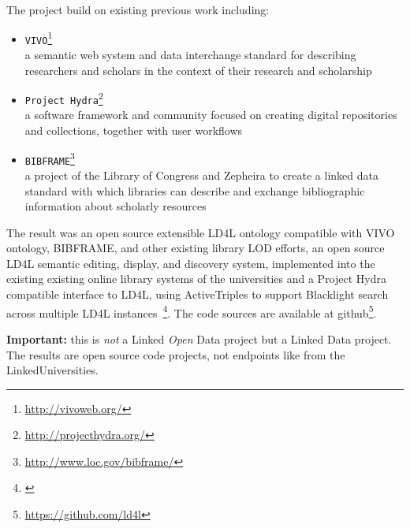 The project build on existing previous work including:

\begin{itemize}
\item \texttt{VIVO}\footnote{\url{http://vivoweb.org/}}~\\
a semantic web system and data interchange standard for describing researchers and scholars in the context of their research and scholarship
\item \texttt{Project Hydra}\footnote{\url{http://projecthydra.org/}}~\\
a software framework and community focused on creating digital repositories and collections, together with user workflows
\item \texttt{BIBFRAME}\footnote{\url{http://www.loc.gov/bibframe/}}~\\
a project of the Library of Congress and Zepheira to create a linked data standard with which libraries can describe and exchange bibliographic information about scholarly resources
\end{itemize}

The result was an open source	extensible LD4L ontology compatible	with	VIVO	ontology,	BIBFRAME,	and	other	existing	library	LOD	efforts, an open source LD4L semantic editing, display, and discovery system, implemented into the existing existing online library systems of the universities and a Project	Hydra	compatible interface to LD4L, using ActiveTriples	to support Blacklight search across multiple LD4L instances~\footnote{\citet{url:ld4l_outcomes}}. The code sources are available at github\footnote{\url{https://github.com/ld4l}}.

\textbf{Important:} this is \textit{not} a Linked \textit{Open} Data project but a Linked Data project. The results are open source code projects, not endpoints like from the LinkedUniversities.
